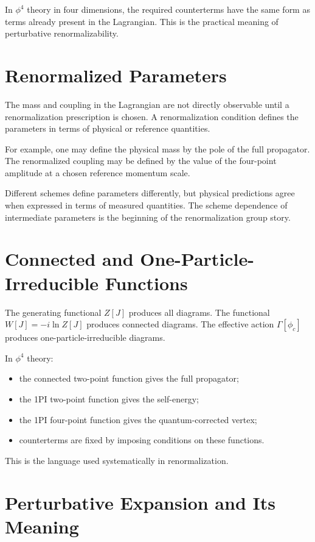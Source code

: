 In \(\phi^4\) theory in four dimensions, the required counterterms have the same
form as terms already present in the Lagrangian. This is the practical meaning
of perturbative renormalizability.

\section{Renormalized Parameters}

The mass and coupling in the Lagrangian are not directly observable until a
renormalization prescription is chosen. A renormalization condition defines the
parameters in terms of physical or reference quantities.

For example, one may define the physical mass by the pole of the full propagator.
The renormalized coupling may be defined by the value of the four-point amplitude
at a chosen reference momentum scale.

Different schemes define parameters differently, but physical predictions agree
when expressed in terms of measured quantities. The scheme dependence of
intermediate parameters is the beginning of the renormalization group story.

\section{Connected and One-Particle-Irreducible Functions}

The generating functional \(Z[J]\) produces all diagrams. The functional
\(W[J]=-i\ln Z[J]\) produces connected diagrams. The effective action
\(\Gamma[\phi_c]\) produces one-particle-irreducible diagrams.

In \(\phi^4\) theory:
\begin{itemize}
    \item the connected two-point function gives the full propagator;
    \item the 1PI two-point function gives the self-energy;
    \item the 1PI four-point function gives the quantum-corrected vertex;
    \item counterterms are fixed by imposing conditions on these functions.
\end{itemize}
This is the language used systematically in renormalization.

\section{Perturbative Expansion and Its Meaning}

